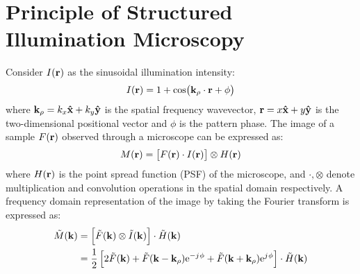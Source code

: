 \documentclass[11pt]{article}
\begin{document}
\section{Principle of Structured Illumination Microscopy}
%
Consider $I(\mathbf{r})$ as the sinusoidal illumination intensity:
%
\begin{equation}
  I(\mathbf{r}) = 1 + \cos(\mathbf{k}_{\rho} \cdot \mathbf{r} + \phi)
  \label{eq:intensity}
\end{equation}
where $\mathbf{k}_{\rho} = k_x \mathbf{\hat{x}} + k_y \mathbf{\hat{y}}$ is the spatial frequency wavevector,  $\mathbf{r} = x \mathbf{\hat{x}} +  y \mathbf{\hat{y}}$ is the two-dimensional positional vector and $\phi$ is the pattern phase. The image of a sample $F(\mathbf{r})$ observed through a microscope can be expressed as:
%
\begin{equation}
  M(\mathbf{r}) = \left[ F(\mathbf{r}) \cdot I(\mathbf{r}) \right] \otimes H(\mathbf{r})
  \label{eq:m_spatial_image}
\end{equation}
%
where $H(\mathbf{r})$ is the point spread function (PSF) of the microscope, and $\cdot, \otimes$ denote multiplication and convolution operations in the spatial domain respectively. A frequency domain representation of the image by taking the Fourier transform is expressed as:
%
\begin{equation}
  \begin{split}
    \tilde{M}(\mathbf{k}) &= \left[ \tilde{F}(\mathbf{k}) \otimes \tilde{I}(\mathbf{k}) \right] \cdot \tilde{H}(\mathbf{k}) \\
     &= \frac{1}{2} \left[ 2\tilde{F}(\mathbf{k}) + \tilde{F}(\mathbf{k} - \mathbf{k}_{\rho}) \mathrm{e}^{- j\mkern1mu \phi} + \tilde{F}(\mathbf{k} + \mathbf{k}_{\rho}) \mathrm{e}^{j\mkern1mu \phi} \right] \cdot \tilde{H}(\mathbf{k})
  \end{split}
  \label{eq:m_ft}
\end{equation}
\end{document}
